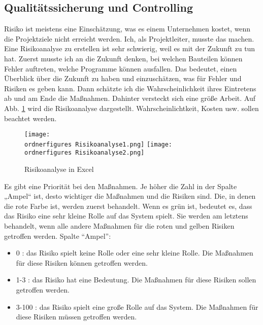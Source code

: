 \subsection{Qualit\"atssicherung und Controlling}
Risiko ist meistens eine Einsch\"atzung, was es einem Unternehmen kostet, wenn die Projektziele nicht erreicht werden. Ich, als Projektleiter, musste das machen. Eine Risikoanalyse zu erstellen ist sehr schwierig, weil es mit der Zukunft zu tun hat. Zuerst musste ich an die Zukunft denken, bei welchen Bauteilen k\"onnen Fehler auftreten, welche Programme k\"onnen ausfallen. Das bedeutet, einen \"Uberblick \"uber die Zukunft zu haben und einzusch\"atzen, was f\"ur Fehler und Risiken es geben kann. Dann sch\"atzte ich die Wahrscheinlichkeit ihres Eintretens ab und am Ende die Ma{\ss}nahmen. Dahinter versteckt sich eine gr{\"o}{\ss}e Arbeit.\cite{Risikoanalyse} 
Auf Abb. \ref{fig:Risikoanalyse} wird die Risikoanalyse dargestellt. Wahrscheinlichtkeit, Kosten usw. sollen beachtet werden.
\begin{figure}[H]
	\texttt{[image: \\ordnerfigures Risikoanalyse1.png]}
	\texttt{[image: \\ordnerfigures Risikoanalyse2.png]}
	\caption{Risikoanalyse in Excel}
	\label{fig:Risikoanalyse}
\end{figure}
Es gibt eine Priorität bei den Maßnahmen. Je höher die Zahl in der Spalte „Ampel“ ist, desto wichtiger die Maßnahmen und die Risiken sind. Die, in denen die rote Farbe ist, werden zuerst behandelt. 
Wenn es grün ist, bedeutet es, dass das Risiko eine sehr kleine Rolle auf das System spielt. Sie werden am letztens behandelt, wenn alle andere Maßnahmen für die roten und gelben Risiken getroffen werden. 
Spalte ``Ampel'': 
\begin{itemize}
	\item 0 : das Risiko spielt keine Rolle oder eine sehr kleine Rolle. Die Maßnahmen für diese Risiken können getroffen werden.
	\item 1-3 : das Risiko hat eine Bedeutung. Die Maßnahmen für diese Risiken sollen getroffen werden.
	\item 3-100 : das Risiko spielt eine große Rolle auf das System. Die Maßnahmen für diese Risiken müssen getroffen werden.
\end{itemize}

